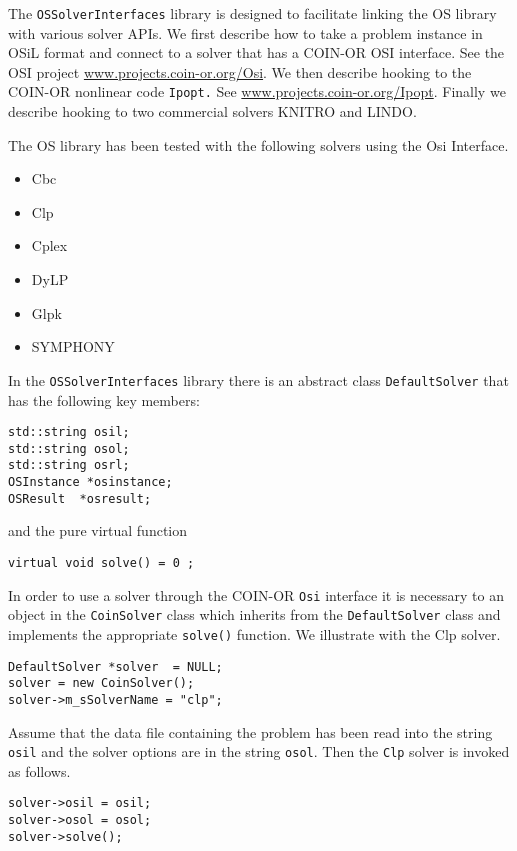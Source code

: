 \documentclass[12pt]{article}
\renewcommand{\_}{{\char"5F}}
\renewcommand{\{}{{\char"7B}}
\renewcommand{\}}{{\char"7D}}
\renewcommand{\^}{{\char"0D}}
\renewcommand{\'}{{\char"0D}}
\begin{document}
The {\tt OSSolverInterfaces} library is designed to facilitate linking the OS library with various solver APIs. We first describe how to take a problem instance in OSiL format and connect to a solver that has a COIN-OR OSI interface.  See the OSI project \url{www.projects.coin-or.org/Osi}.   We then describe hooking to the COIN-OR nonlinear code {\tt Ipopt.} See \url{www.projects.coin-or.org/Ipopt}.  Finally we describe hooking to two commercial solvers KNITRO and LINDO. 

The OS library has been tested with the following solvers using the Osi Interface.

\begin{itemize}
\item Cbc
\item Clp
\item Cplex
\item DyLP
\item Glpk
\item SYMPHONY
\end{itemize}

In the {\tt OSSolverInterfaces} library there is an abstract class {\tt DefaultSolver} that has the following key members:

\begin{verbatim}
std::string osil;
std::string osol;
std::string osrl;
OSInstance *osinstance;
OSResult  *osresult;
\end{verbatim}
and the pure virtual function
\begin{verbatim}
virtual void solve() = 0 ;	
\end{verbatim}
In order to use a solver through the COIN-OR {\tt Osi} interface it is necessary to an object in the {\tt CoinSolver} class which inherits from the {\tt DefaultSolver} class and implements the appropriate {\tt solve()} function.  We illustrate with the Clp solver.

\begin{verbatim}
DefaultSolver *solver  = NULL;
solver = new CoinSolver();
solver->m_sSolverName = "clp";
\end{verbatim}

Assume that the data file containing the problem has been read into the string {\tt osil} and the solver options are in the string {\tt osol}. Then the {\tt Clp} solver is invoked as follows.

\begin{verbatim}
solver->osil = osil;
solver->osol = osol;
solver->solve();
\end{verbatim}
\end{document}
